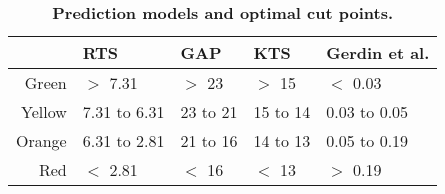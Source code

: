 \begin{table}[!ht]
\centering
\caption{\bf Prediction models and optimal cut points.} 
\label{table:cut_points}
\begin{adjustbox}{max width = \linewidth} 
\begin{tabular} 
{rllll}
  \toprule
 & RTS & GAP & KTS & Gerdin et al. \\ 
  \midrule
Green & $>$ 7.31 & $>$ 23 & $>$ 15 & $<$ 0.03 \\ 
  Yellow & 7.31 to 6.31 & 23 to 21 & 15 to 14 & 0.03 to 0.05 \\ 
  Orange & 6.31 to 2.81 & 21 to 16 & 14 to 13 & 0.05 to 0.19 \\ 
  Red & $<$ 2.81 & $<$ 16 & $<$ 13 & $>$ 0.19 \\ 
   \bottomrule
\end{tabular} 
\end{adjustbox}
\end{table}

